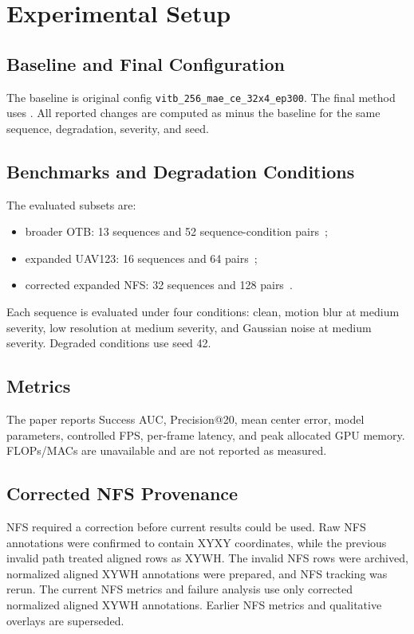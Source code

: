 \section{Experimental Setup}

\subsection{Baseline and Final Configuration}
The baseline is original \baseline{} config \texttt{vitb\_256\_mae\_ce\_32x4\_ep300}. The final method uses \finalconfig{}. All reported changes are computed as \method{} minus the \baseline{} baseline for the same sequence, degradation, severity, and seed.

\subsection{Benchmarks and Degradation Conditions}
The evaluated subsets are:
\begin{itemize}
    \item broader OTB: 13 sequences and 52 sequence-condition pairs~\cite{wu2013otb};
    \item expanded UAV123: 16 sequences and 64 pairs~\cite{mueller2016uav123};
    \item corrected expanded NFS: 32 sequences and 128 pairs~\cite{galoogahi2017nfs}.
\end{itemize}
Each sequence is evaluated under four conditions: clean, motion blur at medium severity, low resolution at medium severity, and Gaussian noise at medium severity. Degraded conditions use seed 42.

\subsection{Metrics}
The paper reports Success AUC, Precision@20, mean center error, model parameters, controlled FPS, per-frame latency, and peak allocated GPU memory. FLOPs/MACs are unavailable and are not reported as measured.

\subsection{Corrected NFS Provenance}
NFS required a correction before current results could be used. Raw NFS annotations were confirmed to contain XYXY coordinates, while the previous invalid path treated aligned rows as XYWH. The invalid NFS rows were archived, normalized aligned XYWH annotations were prepared, and NFS tracking was rerun. The current NFS metrics and failure analysis use only corrected normalized aligned XYWH annotations. Earlier NFS metrics and qualitative overlays are superseded.
